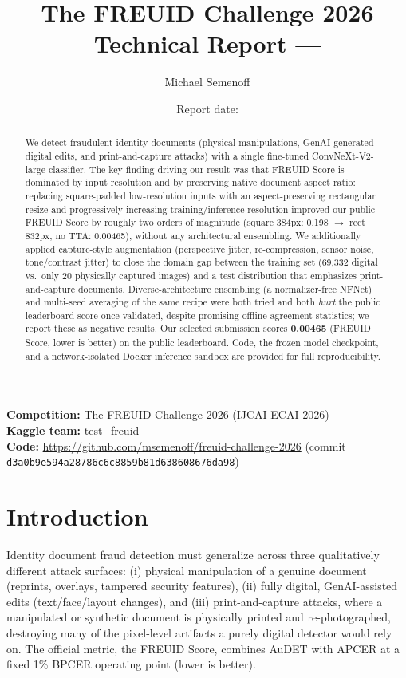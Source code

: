 \documentclass[11pt,a4paper]{article}
\title{%
  \textbf{The FREUID Challenge 2026}\\[0.4em]
  \large Technical Report --- \teamname
}
\author{%
  Michael Semenoff\\
  \texttt{\contactemail}
}
\date{Report date: \reportdate}
\newcommand{\kaggleteam}{test\_freuid}
\begin{document}
\maketitle

\begin{abstract}
We detect fraudulent identity documents (physical manipulations, GenAI-generated
digital edits, and print-and-capture attacks) with a single fine-tuned ConvNeXt-V2-large
classifier. The key finding driving our result was that FREUID Score is dominated by
input resolution and by preserving native document aspect ratio: replacing square-padded
low-resolution inputs with an aspect-preserving rectangular resize and progressively
increasing training/inference resolution improved our public FREUID Score by roughly
two orders of magnitude (square 384px: 0.198 $\rightarrow$ rect 832px, no TTA: 0.00465),
without any architectural ensembling. We additionally applied capture-style
augmentation (perspective jitter, re-compression, sensor noise, tone/contrast jitter)
to close the domain gap between the training set (69{,}332 digital vs.\ only 20
physically captured images) and a test distribution that emphasizes print-and-capture
documents. Diverse-architecture ensembling (a normalizer-free NFNet) and multi-seed
averaging of the same recipe were both tried and both \emph{hurt} the public
leaderboard score once validated, despite promising offline agreement statistics; we
report these as negative results. Our selected submission scores \textbf{0.00465}
(FREUID Score, lower is better) on the public leaderboard. Code, the frozen model
checkpoint, and a network-isolated Docker inference sandbox are provided for full
reproducibility.
\end{abstract}

\noindent\textbf{Competition:} The FREUID Challenge 2026 (IJCAI-ECAI 2026)~\cite{freuid2026}\\
\textbf{Kaggle team:} \kaggleteam\\
\textbf{Code:} \url{https://github.com/msemenoff/freuid-challenge-2026} (commit \texttt{d3a0b9e594a28786c6c8859b81d638608676da98})\\

\section{Introduction}
\label{sec:intro}

Identity document fraud detection must generalize across three qualitatively
different attack surfaces: (i) physical manipulation of a genuine document
(reprints, overlays, tampered security features), (ii) fully digital,
GenAI-assisted edits (text/face/layout changes), and (iii) print-and-capture
attacks, where a manipulated or synthetic document is physically printed and
re-photographed, destroying many of the pixel-level artifacts a purely digital
detector would rely on. The official metric, the FREUID Score, combines AuDET
with APCER at a fixed 1\% BPCER operating point (lower is better).
\end{document}
